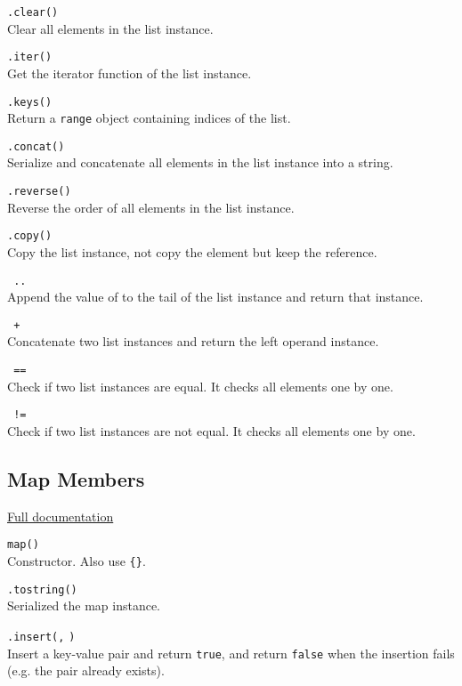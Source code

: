 \hangpar {}\texttt{.clear()}\\
Clear all elements in the list instance.

\hangpar {}\texttt{.iter()}\\
Get the iterator function of the list instance.

\hangpar {}\texttt{.keys()}\\
Return a \texttt{range} object containing indices of the list.

\hangpar {}\texttt{.concat()}\\
Serialize and concatenate all elements in the list instance into a string.

\hangpar {}\texttt{.reverse()}\\
Reverse the order of all elements in the list instance.

\hangpar {}\texttt{.copy()}\\
Copy the list instance, not copy the element but keep the reference.

\hangpar {}\texttt{ .. }\\
Append the value of  to the tail of the list instance and return that instance.

\hangpar {}\texttt{ + }\\
Concatenate two list instances and return the left operand instance.

\hangpar {}\texttt{ == }\\
Check if two list instances are equal. It checks all elements one by one.

\hangpar {}\texttt{ != }\\
Check if two list instances are not equal. It checks all elements one by one.

\subsection*{Map Members}

\hangpar \href{https://github.com/berry-lang/berry/wiki/Chapter-7\#map-class}{Full documentation}

\hangpar \texttt{map()}\\
Constructor. Also use \texttt{\{\}}.

\hangpar {}\texttt{.tostring()}\\
Serialized the map instance.

\hangpar {}\texttt{.insert(}\texttt{,} \texttt{)}\\
Insert a key-value pair and return \texttt{true}, and return \texttt{false} when the insertion fails (e.g. the pair already exists).

